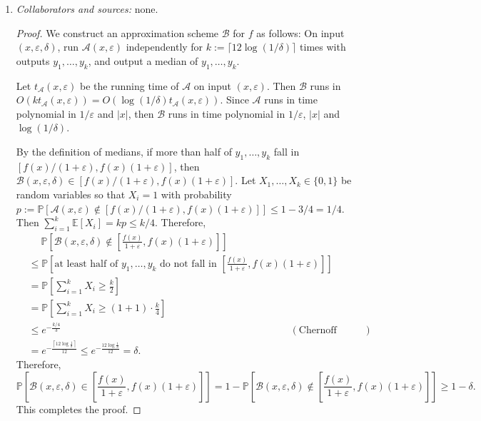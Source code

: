 \documentclass[letterpaper, reqno,11pt]{article}
\newcommand{\PP}{\mathbb{P}}
\newcommand{\EE}{\mathbb{E}}
\begin{document}
\begin{enumerate}
  \item \noindent\emph{Collaborators and sources:} none.

  \bigskip

  \begin{proof}
    We construct an approximation scheme $\mathcal B$ for $f$ as follows: On input $(x, \varepsilon, \delta)$, run $\mathcal A(x, \varepsilon)$ independently for $k := \lceil 12\log (1/\delta) \rceil$ times with outputs $y_1, \ldots, y_k$, and output a median of $y_1, \ldots, y_k$.
    
    Let $t_{\mathcal A}(x, \varepsilon)$ be the running time of $\mathcal A$ on input $(x, \varepsilon)$. Then $\mathcal B$ runs in $O(kt_{\mathcal A}(x, \varepsilon)) = O(\log(1/\delta) t_{\mathcal A}(x, \varepsilon))$. Since $\mathcal A$ runs in time polynomial in $1/\varepsilon$ and $|x|$, then $\mathcal B$ runs in time polynomial in $1/\varepsilon$, $|x|$ and $\log(1/\delta)$.

    By the definition of medians, if more than half of $y_1, \ldots, y_k$ fall in $[f(x)/(1 + \varepsilon), f(x)(1 + \varepsilon)]$, then $\mathcal B(x, \varepsilon, \delta) \in [f(x)/(1 + \varepsilon), f(x)(1 + \varepsilon)]$. Let $X_1, \ldots, X_k \in \{ 0, 1 \}$ be random variables so that $X_i = 1$ with probability $p := \PP[\mathcal A(x, \varepsilon) \not \in [f(x)/(1 + \varepsilon), f(x)(1 + \varepsilon)]] \leq 1 - 3/4 = 1/4$. Then $\sum_{i = 1}^k \EE[X_i] = kp \leq k/4$. Therefore,
    \begin{align*}
      &\quad\; \PP\left[\mathcal B(x, \varepsilon, \delta) \not \in \left[\frac{f(x)}{1 + \varepsilon}, f(x)(1 + \varepsilon)\right]\right] \\
      &\leq \PP\left[\text{at least half of $y_1, \ldots, y_k$ do not fall in $\left[\frac{f(x)}{1 + \varepsilon}, f(x)(1 + \varepsilon)\right]$}\right] \\
      &= \PP\left[\sum_{i = 1}^k X_i \geq \frac{k}{2}\right] \\
      &= \PP\left[\sum_{i = 1}^k X_i \geq (1 + 1) \cdot \frac{k}{4}\right] \\
      &\leq e^{-\frac{k/4}{3}} && (\text{Chernoff bound}) \\
      &= e^{-\frac{\left\lceil 12\log \frac{1}{\delta} \right\rceil}{12}} \leq e^{-\frac{12\log \frac{1}{\delta}}{12}} = \delta.
    \end{align*}
    Therefore,
    $$ \PP\left[\mathcal B(x, \varepsilon, \delta) \in \left[\frac{f(x)}{1 + \varepsilon}, f(x)(1 + \varepsilon)\right]\right] = 1 - \PP\left[\mathcal B(x, \varepsilon, \delta) \not \in \left[\frac{f(x)}{1 + \varepsilon}, f(x)(1 + \varepsilon)\right]\right] \geq 1 - \delta. $$
    This completes the proof.
  \end{proof}
\end{enumerate}
\end{document}
